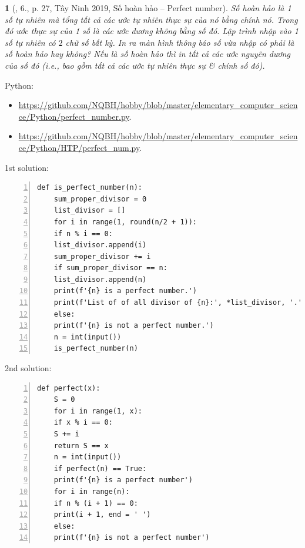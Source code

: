 \documentclass{article}
\newtheorem{baitoan}{}
\begin{document}
\begin{baitoan}[\cite{VietSTEM2021}, 6., p. 27, Tây Ninh 2019, Số hoàn hảo -- Perfect number]
	\emph{Số hoàn hảo} là 1 số tự nhiên mà tổng tất cả các ước tự nhiên thực sự của nó bằng chính nó. Trong đó ước thực sự của 1 số là các ước dương không bằng số đó. Lập trình nhập vào 1 số tự nhiên có $2$ chữ số bất kỳ. In ra màn hình thông báo số vừa nhập có phải là số hoàn hảo hay không? Nếu là số hoàn hảo thì in tất cả các ước nguyên dương của số đó (i.e., bao gồm tất cả các ước tự nhiên thực sự \& chính số đó).
\end{baitoan}
Python:
\begin{itemize}
	\item \url{https://github.com/NQBH/hobby/blob/master/elementary_computer_science/Python/perfect_number.py}.
	\item \url{https://github.com/NQBH/hobby/blob/master/elementary_computer_science/Python/HTP/perfect_num.py}.
\end{itemize}
1st solution:
\begin{Verbatim}[numbers=left,xleftmargin=5mm]
	def is_perfect_number(n):
	sum_proper_divisor = 0
	list_divisor = []
	for i in range(1, round(n/2 + 1)):
	if n % i == 0:
	list_divisor.append(i)
	sum_proper_divisor += i
	if sum_proper_divisor == n:
	list_divisor.append(n)
	print(f'{n} is a perfect number.')
	print(f'List of of all divisor of {n}:', *list_divisor, '.')
	else:
	print(f'{n} is not a perfect number.')
	n = int(input())
	is_perfect_number(n)
\end{Verbatim}
2nd solution:
\begin{Verbatim}[numbers=left,xleftmargin=5mm]
	def perfect(x):
	S = 0
	for i in range(1, x):
	if x % i == 0:
	S += i
	return S == x
	n = int(input())
	if perfect(n) == True:
	print(f'{n} is a perfect number')
	for i in range(n):
	if n % (i + 1) == 0:
	print(i + 1, end = ' ')
	else:
	print(f'{n} is not a perfect number')
\end{Verbatim}
\end{document}
